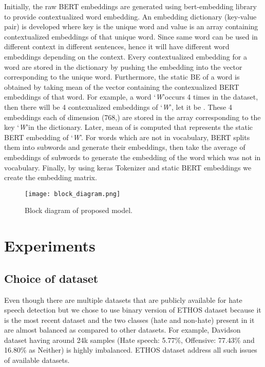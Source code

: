 \documentclass[runningheads]{llncs}
\begin{document}
Initially, the raw BERT embeddings are generated using bert-embedding library \cite{pypi} to provide contextualized word embedding. An embedding dictionary (key-value pair) is developed where key is the unique word and value is an array containing contextualized embeddings of that unique word. Since same word can be used in different context in different sentences, hence it will have different word embeddings depending on the context. Every contextualized embedding for a word are stored in the dictionary \cite{python_dict} by pushing the embedding into the vector corresponding to the unique word. Furthermore, the static BE of a word is obtained by taking mean of the vector containing the contexualized  BERT embeddings of that word. For example, a word \lq\textit{W}\rq occurs 4 times in the dataset, then there will be 4 contexualized embeddings of \lq\textit{W}\rq, let it be {\itshape }. These 4 embeddings each of dimension (768,) are stored in the array corresponding to the key \lq\textit{W}\rq in the dictionary. Later, mean of {\itshape } is computed that represents the static BERT \cite{devlin2018bert} embedding of \lq\textit{W}\rq. For words which are not in vocabulary, BERT \cite{devlin2018bert} splits them into subwords and generate their embeddings, then take the average of embeddings of subwords to generate the embedding of the word which was not in vocabulary. Finally, by using keras Tokenizer \cite{keras-team} and static BERT embeddings we create the embedding matrix.

\begin{figure}[H]
  \texttt{[image: block\_diagram.png]}
  \caption{Block diagram of proposed model.}
  \label{fig:block_diagram}
\end{figure}


\section{Experiments}

\subsection{Choice of dataset}
Even though there are multiple datasets that are publicly available for hate speech detection but we chose to use binary version of ETHOS dataset \cite{mollas2020ethos} because it is the most recent dataset and the two classes (hate and non-hate) present in it are almost balanced as compared to other datasets. For example, Davidson dataset having around 24k samples (Hate speech: 5.77\%, Offensive: 77.43\% and 16.80\% as Neither) \cite{davidson2017automated} is highly imbalanced. ETHOS dataset address all such issues of available datasets.
\end{document}
